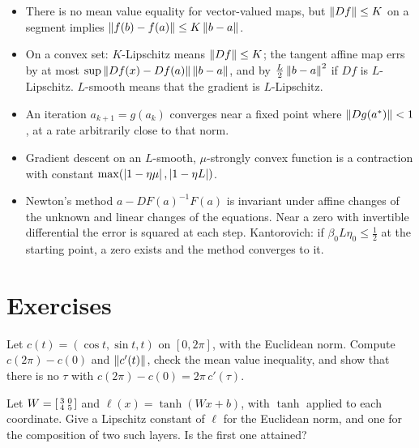 \begin{notechapter}
\begin{chaptersummary}
\begin{itemize}[nosep]
  \item There is no mean value equality for vector-valued maps, but
        $\left\|Df\right\|\leq K$ on a segment implies
        $\left\|f(b) - f(a)\right\|\leq K\left\|b - a\right\|$.
  \item On a convex set: $K$-Lipschitz means $\left\|Df\right\|\leq K$; the
        tangent affine map errs by at most
        $\sup\left\|Df(x) - Df(a)\right\|\left\|b - a\right\|$, and by
        $\frac L2\left\|b - a\right\|^2$ if $Df$ is $L$-Lipschitz. $L$-smooth
        means that the gradient is $L$-Lipschitz.
  \item An iteration $a_{k+1} = g(a_k)$ converges near a fixed point where
        $\left\|Dg(a^*)\right\| < 1$, at a rate arbitrarily close to that norm.
  \item Gradient descent on an $L$-smooth, $\mu$-strongly convex function
        is a contraction with constant
        $\max(\left|1 - \eta\mu\right|, \left|1 - \eta L\right|)$.
  \item Newton's method $a - DF(a)^{-1}F(a)$ is invariant under affine
        changes of the unknown and linear changes of the equations. Near
        a zero with invertible differential the error is squared at each
        step. Kantorovich: if $\beta_0L\eta_0\leq\frac12$ at the starting
        point, a zero exists and the method converges to it.
\end{itemize}
\end{chaptersummary}

\section*{Exercises}

\begin{exercise}\label{contractions-newton:exr:1}
Let $c(t) = (\cos t, \sin t, t)$ on $[0, 2\pi]$, with the Euclidean norm.
Compute $c(2\pi) - c(0)$ and $\left\|c'(t)\right\|$, check the mean value
inequality, and show that there is no $\tau$ with
$c(2\pi) - c(0) = 2\pi\,c'(\tau)$.
\end{exercise}

\begin{exercise}\label{contractions-newton:exr:2}
Let $W = \begin{bsmallmatrix}3 & 0\\4 & 5\end{bsmallmatrix}$ and
$\ell(x) = \tanh(Wx + b)$, with $\tanh$ applied to each coordinate. Give a
Lipschitz constant of $\ell$ for the Euclidean norm, and one for the
composition of two such layers. Is the first one attained?
\end{exercise}


\end{notechapter}
